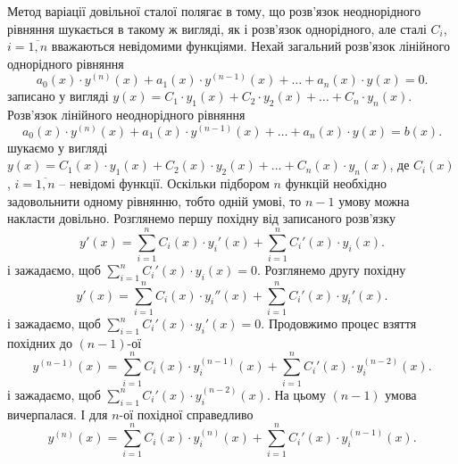 Метод варіації довільної сталої полягає в тому, що розв’язок неоднорідного рівняння шукається в такому ж вигляді, як і розв’язок однорідного, але сталі $C_i$, $i = \overline{1, n}$ вважаються невідомими функціями. Нехай загальний розв’язок лінійного однорідного рівняння
\begin{equation*}
	a_0(x) \cdot y^{(n)}(x) + a_1(x) \cdot y^{(n - 1)}(x) + \ldots + a_n(x) \cdot y(x) = 0.
\end{equation*}
записано у вигляді $y(x) = C_1 \cdot y_1(x) + C_2 \cdot y_2(x) + \ldots + C_n \cdot y_n(x)$. \\

Розв’язок лінійного неоднорідного рівняння
\begin{equation*}
	a_0(x) \cdot y^{(n)}(x) + a_1(x) \cdot y^{(n - 1)}(x) + \ldots + a_n(x) \cdot y(x) = b(x).
\end{equation*}
шукаємо у вигляді $y(x) = C_1(x) \cdot y_1(x) + C_2(x) \cdot y_2(x) + \ldots + C_n(x) \cdot y_n(x)$, де $C_i(x)$, $i = \overline{1, n}$ -- невідомі функції. Оскільки підбором $n$ функцій необхідно задовольнити одному рівнянню, тобто одній умові, то $n - 1$ умову можна накласти довільно. Розглянемо першу похідну від записаного розв’язку
\begin{equation*}
	y'(x) = \sum_{i = 1}^n C_i(x) \cdot y_i'(x) + \sum_{i = 1}^n C_i'(x) \cdot y_i(x).
\end{equation*}
і зажадаємо, щоб $\sum_{i = 1}^n C_i'(x) \cdot y_i(x) = 0$. Розглянемо другу похідну
\begin{equation*}
	y'(x) = \sum_{i = 1}^n C_i(x) \cdot y_i''(x) + \sum_{i = 1}^n C_i'(x) \cdot y_i'(x).
\end{equation*}
і зажадаємо, щоб $\sum_{i = 1}^n C_i'(x) \cdot y_i'(x) = 0$. Продовжимо процес взяття похідних до $(n - 1)$-ої 
\begin{equation*}
	y^{(n - 1)}(x) = \sum_{i = 1}^n C_i(x) \cdot y_i^{(n - 1)}(x) + \sum_{i = 1}^n C_i'(x) \cdot y_i^{(n - 2)}(x).
\end{equation*}
і зажадаємо, щоб $\sum_{i = 1}^n C_i'(x) \cdot y_i^{(n - 2)}(x)$. На цьому $(n - 1)$ умова вичерпалася. І для $n$-ої похідної справедливо
\begin{equation*}
	y^{(n)}(x) = \sum_{i = 1}^n C_i(x) \cdot y_i^{(n)}(x) + \sum_{i = 1}^n C_i'(x) \cdot y_i^{(n - 1)}(x).
\end{equation*}

